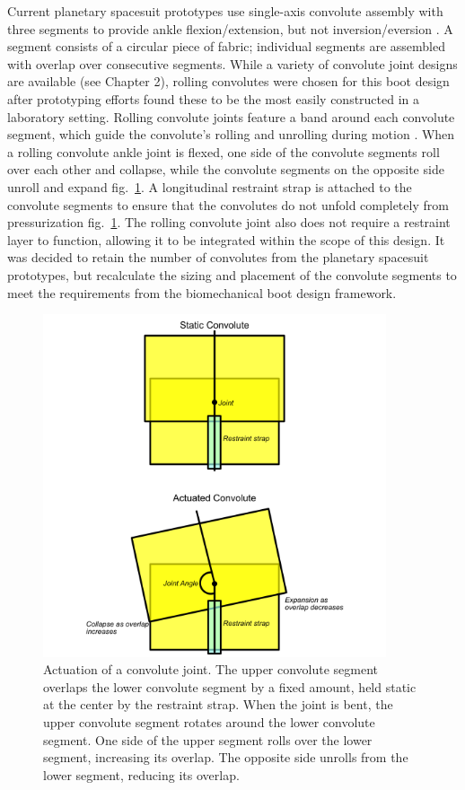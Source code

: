 \documentclass[defaultstyle,11pt]{comps}
\begin{document}
Current planetary spacesuit prototypes use single-axis convolute assembly with three segments to provide ankle flexion/extension, but not inversion/eversion \citep{Ross2002}.
A segment consists of a circular piece of fabric; individual segments are assembled with overlap over consecutive segments.
While a variety of convolute joint designs are available (see Chapter 2), rolling convolutes were chosen for this boot design after prototyping efforts found these to be the most easily constructed in a laboratory setting.
Rolling convolute joints feature a band around each convolute segment, which guide the convolute's rolling and unrolling during motion \citep{Harris2001}.
When a rolling convolute ankle joint is flexed, one side of the convolute segments roll over each other and collapse, while the convolute segments on the opposite side unroll and expand fig.~\ref{fig:SA3-convolute_actuation}.
A longitudinal restraint strap is attached to the convolute segments to ensure that the convolutes do not unfold completely from pressurization fig.~\ref{fig:SA3-convolute_actuation}.
The rolling convolute joint also does not require a restraint layer to function, allowing it to be integrated within the scope of this design.
It was decided to retain the number of convolutes from the planetary spacesuit prototypes, but recalculate the sizing and placement of the convolute segments to meet the requirements from the biomechanical boot design framework.

\begin{figure}
\hypertarget{fig:SA3-convolute_actuation}{%
\centering
\includegraphics[width=0.9\textwidth,height=\textheight]{../fig/SA3/Convolute_Actuation.png}
\caption{Actuation of a convolute joint. The upper convolute segment overlaps the lower convolute segment by a fixed amount, held static at the center by the restraint strap. When the joint is bent, the upper convolute segment rotates around the lower convolute segment. One side of the upper segment rolls over the lower segment, increasing its overlap. The opposite side unrolls from the lower segment, reducing its overlap.}\label{fig:SA3-convolute_actuation}
}
\end{figure}
\end{document}
